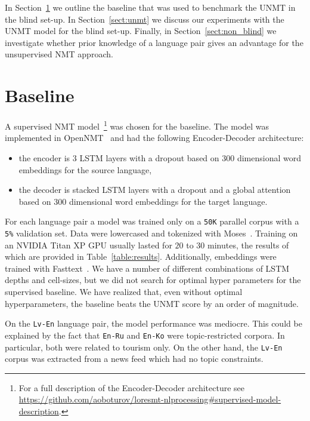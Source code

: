 \documentclass[]{article}
\begin{document}
In Section~\ref{sect:baseline} we outline the baseline that was used to benchmark the \ac{UNMT} in the blind set-up.
In Section~\ref{sect:unmt} we discuss our experiments with the \ac{UNMT} model for the blind set-up.
Finally, in Section~\ref{sect:non_blind} we investigate whether prior knowledge of a language pair gives an advantage for the unsupervised \ac{NMT} approach.

\section{Baseline}
\label{sect:baseline}

A supervised \ac{NMT} model~\footnote{For a full description of the Encoder-Decoder architecture see \url{https://github.com/aoboturov/loresmt-nlprocessing\#supervised-model-description}.} was chosen for the baseline.
The model was implemented in OpenNMT~\citep{opennmt} and had the following Encoder-Decoder architecture:
\begin{itemize}
\item the encoder is $3$ \acs{LSTM} layers with a dropout based on $300$ dimensional word embeddings for the source language,
\item the decoder is stacked \acs{LSTM} layers with a dropout and a global attention \citep{luong2015effective} based on $300$ dimensional word embeddings for the target language.
\end{itemize}

For each language pair a model was trained only on a {\tt 50K} parallel corpus with a {\tt 5\%} validation set.
Data were lowercased and tokenized with Moses~\citep{koehn2007moses}.
Training on an NVIDIA Titan XP GPU usually lasted for $20$ to $30$ minutes, the results of which are provided in Table~\ref{table:results}.
Additionally, embeddings were trained with Fasttext~\citep{bojanowski2017enriching}.
We have a number of different combinations of \acs{LSTM} depths and cell-sizes, but we did not search for optimal hyper parameters for the supervised baseline.
We have realized that, even without optimal hyperparameters, the baseline beats the \ac{UNMT} score by an order of magnitude.

On the {\tt Lv-En} language pair, the model performance was mediocre.
This could be explained by the fact that {\tt En-Ru} and {\tt En-Ko} were topic-restricted corpora.
In particular, both were related to tourism only.
On the other hand, the {\tt Lv-En} corpus was extracted from a news feed which had no topic constraints.
\end{document}
